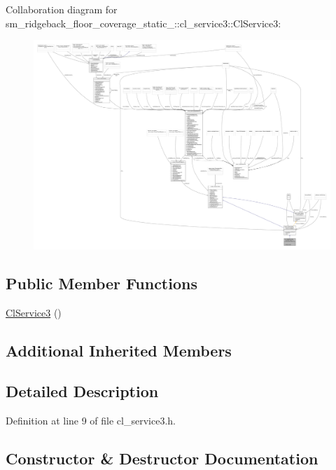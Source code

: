 Collaboration diagram for sm\+\_\+ridgeback\+\_\+floor\+\_\+coverage\+\_\+static\+\_\+:\+:cl\+\_\+service3\+:\+:Cl\+Service3\+:
\nopagebreak
\begin{figure}[H]
\begin{center}
\leavevmode
\includegraphics[width=350pt]{classsm__ridgeback__floor__coverage__static__1_1_1cl__service3_1_1ClService3__coll__graph}
\end{center}
\end{figure}
\subsection*{Public Member Functions}
\begin{DoxyCompactItemize}
\item 
\hyperlink{classsm__ridgeback__floor__coverage__static__1_1_1cl__service3_1_1ClService3_a1c30b317f7752b745f220cd3061a4b1f}{Cl\+Service3} ()
\end{DoxyCompactItemize}
\subsection*{Additional Inherited Members}


\subsection{Detailed Description}


Definition at line 9 of file cl\+\_\+service3.\+h.



\subsection{Constructor \& Destructor Documentation}
\mbox{\label{classsm__ridgeback__floor__coverage__static__1_1_1cl__service3_1_1ClService3_a1c30b317f7752b745f220cd3061a4b1f}} 
